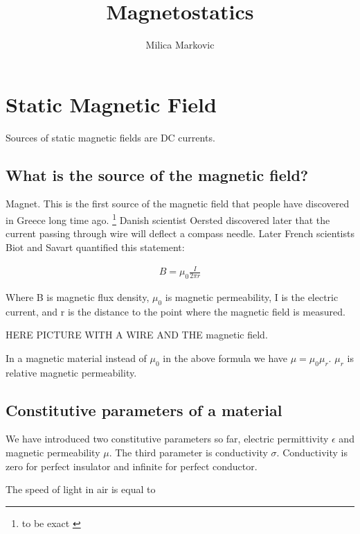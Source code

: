 \documentclass{ximera}
\title{Magnetostatics}
\author{Milica Markovic}
\begin{document}
  
\begin{abstract}  

\end{abstract}  
\maketitle    


\section{Static Magnetic Field}

Sources of static magnetic fields are DC currents.

\subsection{What is the source of the magnetic field?}

Magnet. This is the first source of the magnetic field that people have discovered in Greece long time ago. \footnote{to be exact } Danish scientist Oersted discovered later that the current passing through wire will deflect a compass needle. Later French scientists Biot and Savart quantified this statement:

\begin{eqnarray}
B = \mu_0 \frac{I}{2 \pi r}
\end{eqnarray}

Where B is magnetic flux density, $\mu_0$ is magnetic permeability, I is the electric current, and r is the distance to the point where the magnetic field is measured.

HERE PICTURE WITH A WIRE AND THE magnetic field.



In a magnetic material instead of $\mu_0$ in the above formula we have $\mu=\mu_0 \mu_r$. $\mu_r$ is relative magnetic permeability.

\subsection{Constitutive parameters of a material}

We have introduced two constitutive parameters so far, electric permittivity $\epsilon$ and magnetic permeability $\mu$. The third parameter is conductivity $\sigma$. Conductivity is zero for perfect insulator and infinite for perfect conductor. 

The speed of light in air is equal to 
\end{document}
